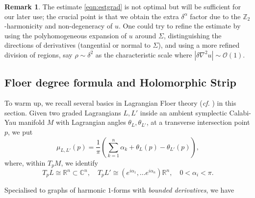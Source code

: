 \documentclass[11pt,a4paper]{article}
\numberwithin{equation}{section}%
\theoremstyle{definition}
\newtheorem{rmk}[thm]{Remark}
\newcommand{\cf}{\emph{cf.} }
\newcommand{\R}{\mathbb{R}}
\newcommand{\C}{\mathbb{C}}
\newcommand{\Z}{\mathbb{Z}}
\begin{document}
\begin{rmk}
    The estimate \eqref{eqn:estgrad} is not optimal but will be sufficient for our later use; the crucial point is that we obtain the extra $\delta^\alpha$ factor due to the $\Z_2$-harmonicity and non-degeneracy of $u$. One could try to refine the estimate by using the polyhomogeneous expansion of $u$ around $\Sigma$, distinguishing the directions of derivatives (tangential or normal to $\Sigma$), and using a more refined division of regions, say $\rho \sim \delta^2$ as the characteristic scale where $|\delta \nabla^2 u|\sim \mathcal{O}(1)$. 
\end{rmk}
 
\subsection{Floer degree formula and Holomorphic Strip}
To warm up, we recall several basics in Lagrangian Floer theory (\cf \cite[Section 2]{IJS}) in this section. Given two graded Lagrangians $L,L'$ inside an ambient symplectic Calabi-Yau manifold $M$ with Lagrangian angles $\theta_L,\theta_{L'}$, at a transverse intersection point $p$, we put 
\begin{equation}
\mu_{L,L'}(p)= \frac{1}{\pi}\left( \sum_{k=1}^n \alpha_k + \theta_L(p)- \theta_{L'}(p) \right) ,  
\end{equation}
where, within $T_pM$, we identify
\[
T_pL\cong \R^n \subset \C^n ,\quad T_p L'\cong (e^{i\alpha_1},\ldots e^{i\alpha_n})\R^n,\quad 0<\alpha_i<\pi.
\]

Specialised to graphs of harmonic $1$-forms with \textit{bounded derivatives}, we have
\end{document}

